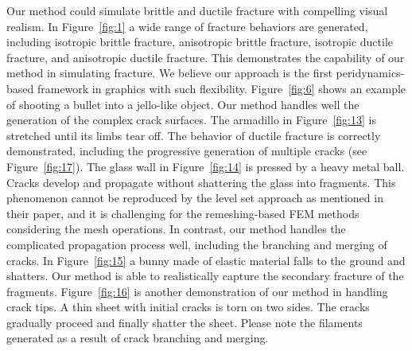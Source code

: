  Our method could simulate brittle and ductile fracture with compelling visual realism. In Figure~\ref{fig:1} a wide range of fracture behaviors are generated, including isotropic brittle fracture, anisotropic brittle fracture, isotropic ductile fracture, and anisotropic ductile fracture. This demonstrates the capability of our method in simulating fracture. We believe our approach is the first peridynamics-based framework in graphics with such flexibility. Figure~\ref{fig:6} shows an example of shooting a bullet into a jello-like object. Our method handles well the generation of the complex crack surfaces. The armadillo in Figure~\ref{fig:13} is stretched until its limbs tear off. The behavior of ductile fracture is correctly demonstrated, including the progressive generation of multiple cracks (see Figure~\ref{fig:17}). The glass wall in Figure~\ref{fig:14} is pressed by a heavy metal ball. Cracks develop and propagate without shattering the glass into fragments. This phenomenon cannot be reproduced by the level set approach \cite{Hegemann:2013:LSM:2485895.2485908} as mentioned in their paper, and it is challenging for the remeshing-based FEM methods \cite{O'Brien:1999:GMA:311535.311550,O'Brien:2002:GMA:566654.566579} considering the mesh operations. In contrast, our method handles the complicated propagation process well, including the branching and merging of cracks. In Figure~\ref{fig:15} a bunny made of elastic material falls to the ground and shatters. Our method is able to realistically capture the secondary fracture of the fragments. Figure~\ref{fig:16} is another demonstration of our method in handling crack tips. A thin sheet with initial cracks is torn on two sides. The cracks gradually proceed and finally shatter the sheet. Please note the filaments generated as a result of crack branching and merging.

